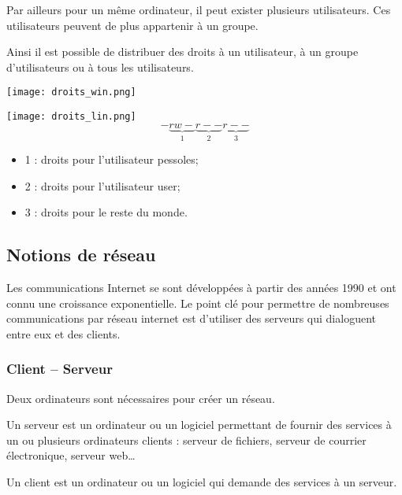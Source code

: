 Par ailleurs pour un même ordinateur, il peut exister plusieurs utilisateurs. Ces utilisateurs peuvent de plus appartenir à un groupe.

Ainsi il est possible de distribuer des droits à un utilisateur, à un groupe d'utilisateurs ou à tous les utilisateurs.  

\begin{minipage}[c]{.45\linewidth}
\begin{center}
\texttt{[image: droits\_win.png]}
\end{center}
\end{minipage}\hfill
\begin{minipage}[c]{.45\linewidth}
\begin{center}
\texttt{[image: droits\_lin.png]}
$$
-\underbrace{rw-}_{1}\underbrace{r--}_{2}\underbrace{r--}_{3}
$$
\begin{itemize}
\item 1 : droits pour l'utilisateur pessoles;
\item 2 : droits pour l'utilisateur user;
\item 3 : droits pour le reste du monde.
\end{itemize}
\end{center}
\end{minipage}



\subsection{Notions de réseau}
Les communications Internet se sont développées à partir des années 1990 et ont connu une croissance exponentielle. Le point clé pour permettre de nombreuses communications par réseau internet est d’utiliser des serveurs qui dialoguent entre eux et des clients.
\subsubsection{Client -- Serveur}
Deux ordinateurs sont nécessaires pour créer un réseau.
\begin{defi}[Serveur]
Un serveur est un ordinateur ou un logiciel permettant de fournir des services à un ou plusieurs ordinateurs clients : serveur de fichiers, serveur de courrier électronique, serveur web…
\end{defi}

\begin{defi}[Client]
Un client est un ordinateur ou un logiciel qui demande des services à un serveur. 
\end{defi}

